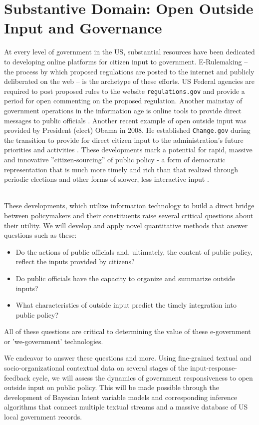 \section{Substantive Domain: Open Outside Input and Governance}

At every level of government in the US, substantial resources have been dedicated to developing online platforms for citizen input to government. E-Rulemaking \cite{Coglianese2004} -- the process by which proposed regulations are posted to the internet and publicly deliberated on the web -- is the archetype of these efforts. US Federal agencies are required to post proposed rules to the website \texttt{regulations.gov} and provide a period for open commenting on the proposed regulation. Another mainstay of government operations in the information age is online tools to provide direct messages to public officials \cite{Balla2007}. Another recent example of open outside input was provided by President (elect) Obama in 2008. He established \texttt{Change.gov} during the transition to provide for direct citizen input to the administration's future priorities and activities \cite{Borins2009}. These developments mark a potential for rapid, massive and innovative ''citizen-sourcing'' of public policy - a form of democratic representation that is much more timely and rich than that realized through periodic elections and other forms of slower, less interactive input  \cite{Linders2012}.


~\\
 These developments, which utilize information technology to build a direct bridge between policymakers and their constituents raise several critical questions about their utility. We will develop and apply novel quantitative methods that answer questions such as these:
\begin{itemize}
\item Do the actions of public officials and, ultimately, the content of public policy, reflect the inputs provided by citizens?
\item Do public officials have the capacity to organize and summarize outside inputs?
\item What characteristics of outside input predict the timely integration into public policy?
\end{itemize} All of these questions are critical to determining the value of these e-government or 'we-government' technologies.


We endeavor to answer these questions and more. Using fine-grained textual and socio-organizational contextual data on several stages of the input-response-feedback cycle, we will assess the dynamics of government responsiveness to open outside input on public policy. This will be made possible through the development of Bayesian latent variable models and corresponding inference algorithms that connect multiple textual streams and a massive database of US local government records.


